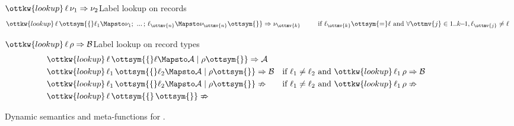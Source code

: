 \begin{figure}[t]
  \small
  \ottdefnsTargetStep

  \begin{rulesection}{$\ottkw{lookup} \, \ell \, \nu_{{\mathrm{1}}}  \Rightarrow  \nu_{{\mathrm{2}}}$}{Label lookup on records}
    \begin{align*}
      \ottkw{lookup} \, \ell \, \ottsym{\{}  \ell_{{\mathrm{1}}}  \Mapsto  \nu_{{\mathrm{1}}}  ; \, \, ... \, ; \,  \ell_{\ottmv{n}}  \Mapsto  \nu_{\ottmv{n}}  \ottsym{\}}  \Rightarrow  \nu_{\ottmv{k}}\;\;\qquad
      \text{if}\ \ell_{\ottmv{k}}  \ottsym{=}  \ell\ \text{and}\ \forall \ottmv{j} \in 1 .. k\!\!-\!\!1,  \ell_{\ottmv{j}}  \neq  \ell \;\;
    \end{align*}
  \end{rulesection}

  \begin{rulesection}{$\ottkw{lookup} \, \ell \, \rho  \Rightarrow  \mathcal{B}$}{Label lookup on record types}
    \begin{align*}
      &\ottkw{lookup} \, \ell \, \ottsym{\{}  \ell  \Mapsto  \mathcal{A}  \mid  \rho  \ottsym{\}}  \Rightarrow  \mathcal{A}&&\\
      &\ottkw{lookup} \, \ell_{{\mathrm{1}}} \, \ottsym{\{}  \ell_{{\mathrm{2}}}  \Mapsto  \mathcal{A}  \mid  \rho  \ottsym{\}}  \Rightarrow  \mathcal{B}&&\text{if}\  \ell_{{\mathrm{1}}}  \neq  \ell_{{\mathrm{2}}} \ \text{and}\ \ottkw{lookup} \, \ell_{{\mathrm{1}}} \, \rho  \Rightarrow  \mathcal{B}\\
      &\ottkw{lookup} \, \ell_{{\mathrm{1}}} \, \ottsym{\{}  \ell_{{\mathrm{2}}}  \Mapsto  \mathcal{A}  \mid  \rho  \ottsym{\}}  \nRightarrow&&\text{if}\  \ell_{{\mathrm{1}}}  \neq  \ell_{{\mathrm{2}}} \ \text{and}\ \ottkw{lookup} \, \ell_{{\mathrm{1}}} \, \rho  \nRightarrow\\
      &\ottkw{lookup} \, \ell \, \ottsym{\{}  \,  \ottsym{\}}  \nRightarrow&&
    \end{align*}
  \end{rulesection}

  \caption{Dynamic semantics and meta-functions for \lambdar.}
  \label{fig:target-eval}
\end{figure}

